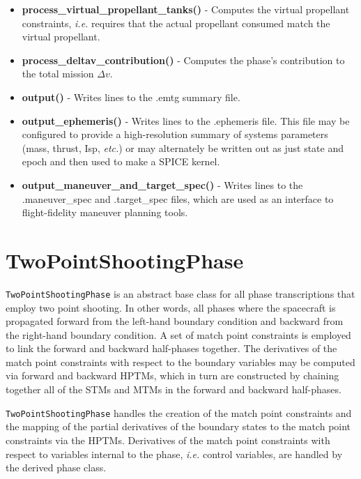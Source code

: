 \begin{itemize}
	\item \textbf{process\_virtual\_propellant\_tanks()} - Computes the virtual propellant constraints, \textit{i.e.} requires that the actual propellant consumed match the virtual propellant.
	
	\item \textbf{process\_deltav\_contribution()} - Computes the phase's contribution to the total mission $\Delta v$.

	\item \textbf{output()} - Writes lines to the .emtg summary file.
	\item \textbf{output\_ephemeris()} - Writes lines to the .ephemeris file. This file may be configured to provide a high-resolution summary of systems parameters (mass, thrust, \ac{Isp}, \textit{etc.}) or may alternately be written out as just state and epoch and then used to make a SPICE kernel.
	\item \textbf{output\_maneuver\_and\_target\_spec()} - Writes lines to the .maneuver\_spec and .target\_spec files, which are used as an interface to flight-fidelity maneuver planning tools.
\end{itemize}

\section{TwoPointShootingPhase}
\label{sec:two_point_shooting_phase}

\texttt{TwoPointShootingPhase} is an abstract base class for all phase transcriptions that employ two point shooting. In other words, all phases where the spacecraft is propagated forward from the left-hand boundary condition and backward from the right-hand boundary condition. A set of match point constraints is employed to link the forward and backward half-phases together. The derivatives of the match point constraints with respect to the boundary variables may be computed via forward and backward \ac{HPTM}s, which in turn are constructed by chaining together all of the \ac{STM}s and \ac{MTM}s in the forward and backward half-phases.

\texttt{TwoPointShootingPhase} handles the creation of the match point constraints and the mapping of the partial derivatives of the boundary states to the match point constraints via the \ac{HPTM}s. Derivatives of the match point constraints with respect to variables internal to the phase, \textit{i.e.} control variables, are handled by the derived phase class.

